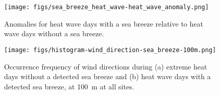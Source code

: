 \documentclass[11pt,a4paper]{article}
\begin{document}
\begin{figure}[ht]
	\centering
	\texttt{[image: figs/sea\_breeze\_heat\_wave-heat\_wave\_anomaly.png]}
	\caption{Anomalies for heat wave days with a sea breeze relative to heat wave days without a sea breeze.}
	\label{fig:sea_breeze_heat_wave_anomaly}
\end{figure}

\begin{figure}[ht]
	\centering
	\texttt{[image: figs/histogram-wind\_direction-sea\_breeze-100m.png]}
	\caption{Occurrence frequency of wind directions during (a) extreme heat days without a detected sea breeze and (b) heat wave days with a detected sea breeze, at \SI{100}{\meter} at all sites.}
	\label{fig:wind_direction-heat_wave-sea_breeze-histogram}
\end{figure}
\end{document}
